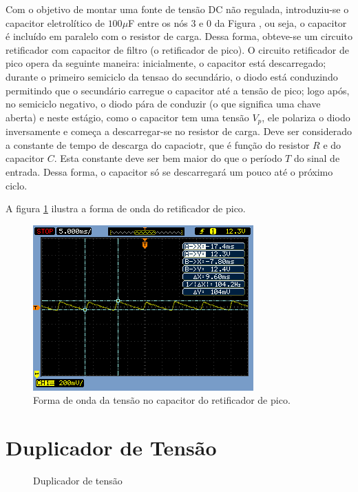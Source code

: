 \documentclass[a4paper]{article} %
\renewcommand{\thefigure}{\thesection.\arabic{figure}}
\begin{document}
\newpage
    Com o objetivo de montar uma fonte de tensão DC não regulada, introduziu-se o capacitor eletrolítico de  $100\mu$F entre os nós 3 e 0 da Figura \label{fig:ret-circ2}, ou seja, o capacitor é incluído em paralelo com o resistor de carga. Dessa forma, obteve-se um circuito retificador com capacitor de filtro (o retificador de pico).
         O circuito retificador de pico opera da seguinte maneira: inicialmente, o capacitor está descarregado; durante o primeiro semiciclo da tensao do secundário, o diodo está conduzindo permitindo que o secundário carregue o capacitor até a tensão de pico; logo após, no semiciclo negativo, o diodo pára de conduzir (o que significa uma chave aberta) e neste estágio, como o capacitor tem uma tensão $V_p$, ele polariza o diodo inversamente e começa a descarregar-se no resistor de carga. Deve ser considerado a constante de tempo de descarga do capaciotr, que é função do resistor $R$ e do capacitor $C$. Esta constante deve ser bem maior do que o período $T$ do sinal de entrada. Dessa forma, o capacitor só se descarregará um pouco até o próximo ciclo.

A figura \ref{fig:cap-ret} ilustra a forma de onda do retificador de pico.

\begin{figure}[h!]
\begin{centering}
\includegraphics[scale=0.7]{Imagens/3.3.4capacitor_paralelo/3cap} \caption{Forma de onda da tensão no capacitor do retificador de pico. \label{fig:cap-ret}}
\par\end{centering}
\end{figure}

\newpage

\renewcommand{\thefigure}{\thesection.\arabic{figure}}

\section{Duplicador de Tensão}
 \setcounter{figure}{0}
\vspace{3mm}
\begin{figure}[h]
\centerline{}
\caption{Duplicador de tensão \label{tab:circ}}
\end{figure}
\end{document}
